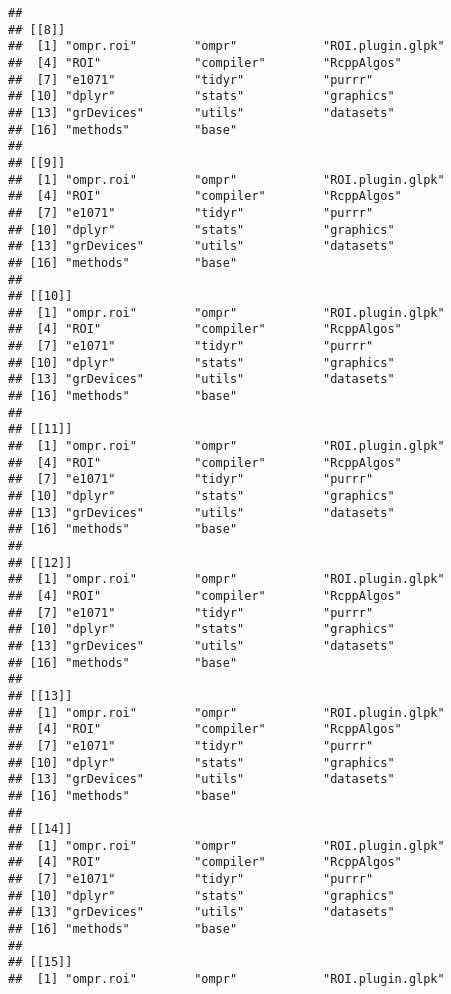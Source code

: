 \documentclass[]{article}
\begin{document}
\begin{verbatim}
## 
## [[8]]
##  [1] "ompr.roi"        "ompr"            "ROI.plugin.glpk"
##  [4] "ROI"             "compiler"        "RcppAlgos"      
##  [7] "e1071"           "tidyr"           "purrr"          
## [10] "dplyr"           "stats"           "graphics"       
## [13] "grDevices"       "utils"           "datasets"       
## [16] "methods"         "base"           
## 
## [[9]]
##  [1] "ompr.roi"        "ompr"            "ROI.plugin.glpk"
##  [4] "ROI"             "compiler"        "RcppAlgos"      
##  [7] "e1071"           "tidyr"           "purrr"          
## [10] "dplyr"           "stats"           "graphics"       
## [13] "grDevices"       "utils"           "datasets"       
## [16] "methods"         "base"           
## 
## [[10]]
##  [1] "ompr.roi"        "ompr"            "ROI.plugin.glpk"
##  [4] "ROI"             "compiler"        "RcppAlgos"      
##  [7] "e1071"           "tidyr"           "purrr"          
## [10] "dplyr"           "stats"           "graphics"       
## [13] "grDevices"       "utils"           "datasets"       
## [16] "methods"         "base"           
## 
## [[11]]
##  [1] "ompr.roi"        "ompr"            "ROI.plugin.glpk"
##  [4] "ROI"             "compiler"        "RcppAlgos"      
##  [7] "e1071"           "tidyr"           "purrr"          
## [10] "dplyr"           "stats"           "graphics"       
## [13] "grDevices"       "utils"           "datasets"       
## [16] "methods"         "base"           
## 
## [[12]]
##  [1] "ompr.roi"        "ompr"            "ROI.plugin.glpk"
##  [4] "ROI"             "compiler"        "RcppAlgos"      
##  [7] "e1071"           "tidyr"           "purrr"          
## [10] "dplyr"           "stats"           "graphics"       
## [13] "grDevices"       "utils"           "datasets"       
## [16] "methods"         "base"           
## 
## [[13]]
##  [1] "ompr.roi"        "ompr"            "ROI.plugin.glpk"
##  [4] "ROI"             "compiler"        "RcppAlgos"      
##  [7] "e1071"           "tidyr"           "purrr"          
## [10] "dplyr"           "stats"           "graphics"       
## [13] "grDevices"       "utils"           "datasets"       
## [16] "methods"         "base"           
## 
## [[14]]
##  [1] "ompr.roi"        "ompr"            "ROI.plugin.glpk"
##  [4] "ROI"             "compiler"        "RcppAlgos"      
##  [7] "e1071"           "tidyr"           "purrr"          
## [10] "dplyr"           "stats"           "graphics"       
## [13] "grDevices"       "utils"           "datasets"       
## [16] "methods"         "base"           
## 
## [[15]]
##  [1] "ompr.roi"        "ompr"            "ROI.plugin.glpk"

\end{verbatim}
\end{document}
